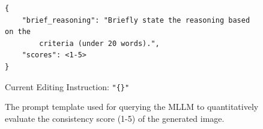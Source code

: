 \begin{figure}[htbp]
\begin{tcolorbox}
\begin{verbatim}
{
    "brief_reasoning": "Briefly state the reasoning based on the 
        criteria (under 20 words).",
    "scores": <1-5>
}
\end{verbatim}

\noindent Current Editing Instruction: \texttt{"\{\}"}

\end{tcolorbox}
\caption{The prompt template used for querying the MLLM to quantitatively evaluate the consistency score (1-5) of the generated image.}
\label{fig:vsa_quantitative_prompt}
\end{figure}
